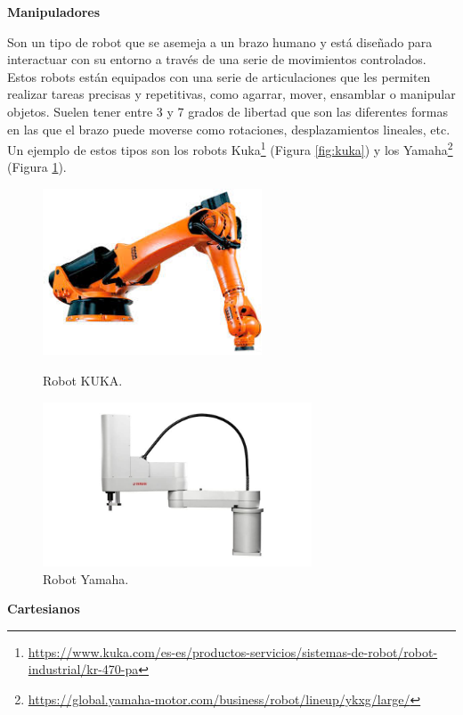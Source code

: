 \noindent\textbf{Manipuladores} 

Son un tipo de robot que se asemeja a un brazo humano y está diseñado para interactuar con su entorno a través de una serie de movimientos controlados. Estos robots están equipados con una serie de articulaciones que les permiten realizar tareas precisas y repetitivas, como agarrar, mover, ensamblar o manipular objetos. Suelen tener entre 3 y 7 grados de libertad que son las diferentes formas en las que el brazo puede moverse como rotaciones, desplazamientos lineales, etc. Un ejemplo de estos tipos son los robots Kuka\footnote{\url{https://www.kuka.com/es-es/productos-servicios/sistemas-de-robot/robot-industrial/kr-470-pa}} (Figura \ref{fig:kuka}) y los Yamaha\footnote{\url{https://global.yamaha-motor.com/business/robot/lineup/ykxg/large/}} (Figura \ref{fig:yamaha}).


\begin{figure}[h!]
  \begin{minipage}{0.48\textwidth}
    \centering
    \includegraphics[width=6.5cm]{figs/kuka}
    \caption{Robot KUKA.}
    \label{fig:kuka}
  \end{minipage}
  \hfill
  \begin{minipage}{0.48\textwidth}
    \centering
    \includegraphics[width=8cm]{figs/yamaha}
    \caption{Robot Yamaha.} 
    \label{fig:yamaha}
  \end{minipage}
\end{figure}

\noindent\textbf{Cartesianos} 

